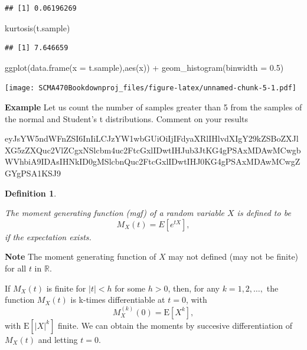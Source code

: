 \documentclass[
]{book}
\newenvironment{Shaded}{\begin{snugshade}}{\end{snugshade}}
\newcommand{\AttributeTok}[1]{\textcolor[rgb]{0.77,0.63,0.00}{#1}}
\newcommand{\FloatTok}[1]{\textcolor[rgb]{0.00,0.00,0.81}{#1}}
\newcommand{\FunctionTok}[1]{\textcolor[rgb]{0.00,0.00,0.00}{#1}}
\newcommand{\NormalTok}[1]{#1}
\newcommand{\SpecialCharTok}[1]{\textcolor[rgb]{0.00,0.00,0.00}{#1}}
\theoremstyle{definition}
\newtheorem{definition}{Definition}[chapter]
\theoremstyle{definition}
\theoremstyle{definition}
\theoremstyle{definition}
\theoremstyle{remark}
\begin{document}
\begin{verbatim}
## [1] 0.06196269
\end{verbatim}

\begin{Shaded}
\begin{Highlighting}[]
\FunctionTok{kurtosis}\NormalTok{(t.sample)}
\end{Highlighting}
\end{Shaded}

\begin{verbatim}
## [1] 7.646659
\end{verbatim}

\begin{Shaded}
\begin{Highlighting}[]
\FunctionTok{ggplot}\NormalTok{(}\FunctionTok{data.frame}\NormalTok{(}\AttributeTok{x =}\NormalTok{ t.sample),}\FunctionTok{aes}\NormalTok{(x)) }\SpecialCharTok{+} \FunctionTok{geom\_histogram}\NormalTok{(}\AttributeTok{binwidth =} \FloatTok{0.5}\NormalTok{)}
\end{Highlighting}
\end{Shaded}

\texttt{[image: SCMA470Bookdownproj\_files/figure-latex/unnamed-chunk-5-1.pdf]}

\textbf{Example} Let us count the number of samples greater than 5 from the samples of the normal and Student's t distributions. Comment on your results

eyJsYW5ndWFnZSI6InIiLCJzYW1wbGUiOiIjIFdyaXRlIHlvdXIgY29kZSBoZXJlXG5zZXQuc2VlZCgxNSlcbm4uc2FtcGxlIDwtIHJub3JtKG4gPSAxMDAwMCwgbWVhbiA9IDAsIHNkID0gMSlcbnQuc2FtcGxlIDwtIHJ0KG4gPSAxMDAwMCwgZGYgPSA1KSJ9

\begin{definition}
\protect\hypertarget{def:unlabeled-div-15}{}\label{def:unlabeled-div-15}

\emph{The moment generating function (mgf) of a random
variable \(X\) is defined to be \[M_X(t) = E[e^{tX}],\] if the expectation
exists.}

\end{definition}

\textbf{Note} The moment generating function of \(X\) may not defined (may not
be finite) for all \(t\) in \(\mathbb{R}\).

If \(M_X(t)\) is finite for \(|t| < h\) for some \(h > 0\), then, for any
\(k = 1, 2, \ldots,\) the function \(M_X(t)\) is k-times differentiable at
\(t = 0\), with \[M^{(k)}_X (0) = \mathrm{E}[X^k],\] with
\(\mathrm{E}[|X|^k]\) finite. We can obtain the moments by succesive
differentiation of \(M_X(t)\) and letting \(t = 0\).
\end{document}

